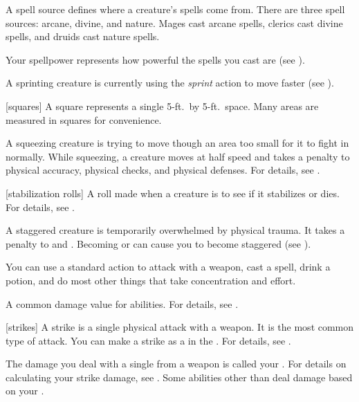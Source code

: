  A spell source defines where a creature's spells come from.
There are three spell sources: arcane, divine, and nature.
Mages cast arcane spells, clerics cast divine spells, and druids cast nature spells.

 Your spellpower represents how powerful the spells you cast are (see ).

 A sprinting creature is currently using the \textit{sprint} action to move faster (see ).

[squares] A square represents a single 5-ft.\ by 5-ft.\ space.
Many areas are measured in squares for convenience.

 A squeezing creature is trying to move though an area too small for it to fight in normally.
While squeezing, a creature moves at half speed and takes a  penalty to physical accuracy, physical checks, and physical defenses.
For details, see .

[stabilization rolls] A roll made when a creature is  to see if it stabilizes or dies. For details, see .

 A staggered creature is temporarily overwhelmed by physical trauma.
It takes a  penalty to  and .
Becoming  or  can cause you to become staggered (see ).

 You can use a standard action to attack with a weapon, cast a spell, drink a potion, and do most other things that take concentration and effort.

 A common damage value for abilities.
For details, see .

[strikes] A strike is a single physical attack with a weapon.
It is the most common type of attack.
You can make a strike as a  in the .
For details, see .

 The damage you deal with a single  from a weapon is called your .
For details on calculating your strike damage, see .
Some abilities other than  deal damage based on your .

